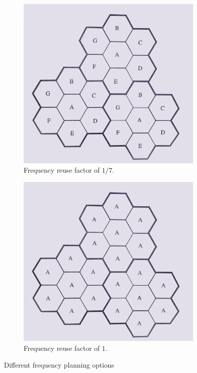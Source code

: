 \begin{figure}[t]
    \centering
    \begin{subfigure}[b]{0.45\textwidth}
            \includegraphics[width=\textwidth]{./01.introduction/img/frequency_reuse.png}
        \caption{Frequency reuse factor of $1 / 7$.}
        \label{fig:freuse}
    \end{subfigure}
    \begin{subfigure}[b]{0.45\textwidth}
        \includegraphics[width=\textwidth]{./01.introduction/img/universal_freq_reuse.png}
        \caption{Frequency reuse factor of $1$.}
        \label{fig:ufreuse}
    \end{subfigure}
    \caption{Different frequency planning options}
\end{figure}

